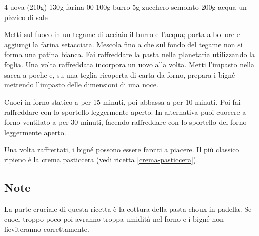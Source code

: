 \begin{ingreds}
	4 uova (210g)
	130g farina 00
	100g burro
	5g zucchero semolato
	200g acqua
	un pizzico di sale


\end{ingreds}

\begin{method}
Metti sul fuoco in un tegame di acciaio il burro e l'acqua; porta a bollore e aggiungi la farina setacciata. Mescola fino a che sul fondo del tegame non si forma una patina bianca.
Fai raffreddare la pasta nella planetaria utilizzando la foglia. Una volta raffreddata incorpora un uovo alla volta.
Metti l'impasto nella sacca a poche e, su una teglia ricoperta di carta da forno, prepara i bigné mettendo l'impasto delle dimensioni di una noce.

	Cuoci in forno statico a  per 15 minuti, poi abbassa a  per 10 minuti. Poi fai raffreddare con lo sportello leggermente aperto.
In alternativa puoi cuocere a forno ventilato a  per 30 minuti, facendo raffreddare con lo sportello del forno leggermente aperto.

	Una volta raffrettati, i bigné possono essere farciti a piacere. Il più classico ripieno è la crema pasticcera (vedi ricetta \ref{crema-pasticcera}).
\end{method}

\subsection*{Note}
	La parte cruciale di questa ricetta è la cottura della pasta choux in padella. Se cuoci troppo poco poi avranno troppa umidità nel forno e i bigné non lieviteranno correttamente.



